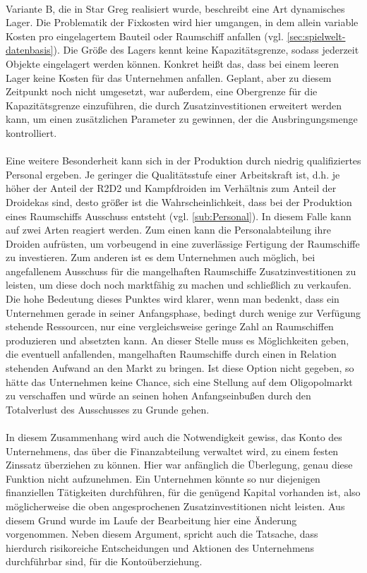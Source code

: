 \\
Variante B, die in Star Greg realisiert wurde, beschreibt eine Art dynamisches Lager. Die Problematik der Fixkosten wird hier umgangen, in dem allein variable Kosten pro eingelagertem Bauteil oder Raumschiff anfallen (vgl. \ref{sec:spielwelt-datenbasis}). Die Größe des Lagers kennt keine Kapazitätsgrenze, sodass jederzeit Objekte eingelagert werden können. Konkret heißt das, dass bei einem leeren Lager keine Kosten für das Unternehmen anfallen. Geplant, aber zu diesem Zeitpunkt noch nicht umgesetzt, war außerdem, eine Obergrenze für die Kapazitätsgrenze einzuführen, die durch Zusatzinvestitionen erweitert werden kann, um einen zusätzlichen Parameter zu gewinnen, der die Ausbringungsmenge kontrolliert. 
\\
\\
Eine weitere Besonderheit kann sich in der Produktion durch niedrig qualifiziertes Personal ergeben. Je geringer die Qualitätsstufe einer Arbeitskraft ist, d.h. je höher der Anteil der R2D2 und Kampfdroiden im Verhältnis zum Anteil der Droidekas sind, desto größer ist die Wahrscheinlichkeit, dass bei der Produktion eines Raumschiffs Ausschuss entsteht (vgl. \ref{sub:Personal}). In diesem Falle kann auf zwei Arten reagiert werden. Zum einen kann die Personalabteilung ihre Droiden aufrüsten, um vorbeugend in eine zuverlässige Fertigung der Raumschiffe zu investieren. Zum anderen ist es dem Unternehmen auch möglich, bei angefallenem Ausschuss für die mangelhaften Raumschiffe Zusatzinvestitionen zu leisten, um diese doch noch marktfähig zu machen und schließlich zu verkaufen. Die hohe Bedeutung dieses Punktes wird klarer, wenn man bedenkt, dass ein Unternehmen gerade in seiner Anfangsphase, bedingt durch wenige zur Verfügung stehende Ressourcen, nur eine vergleichsweise geringe Zahl an Raumschiffen produzieren und absetzten kann. An dieser Stelle muss es Möglichkeiten geben, die eventuell anfallenden, mangelhaften Raumschiffe durch einen in Relation stehenden Aufwand an den Markt zu bringen. Ist diese Option nicht gegeben, so hätte das Unternehmen keine Chance, sich eine Stellung auf dem Oligopolmarkt zu verschaffen und würde an seinen hohen Anfangseinbußen durch den Totalverlust des Ausschusses zu Grunde gehen. 
\\
\\
In diesem Zusammenhang wird auch die Notwendigkeit gewiss, das Konto des Unternehmens, das über die Finanzabteilung verwaltet wird, zu einem festen Zinssatz überziehen zu können. Hier war anfänglich die Überlegung, genau diese Funktion nicht aufzunehmen. Ein Unternehmen könnte so nur diejenigen finanziellen Tätigkeiten durchführen, für die genügend Kapital vorhanden ist, also möglicherweise die oben angesprochenen Zusatzinvestitionen nicht leisten. Aus diesem Grund wurde im Laufe der Bearbeitung hier eine Änderung vorgenommen.  Neben diesem Argument, spricht auch die Tatsache, dass hierdurch risikoreiche Entscheidungen und Aktionen des Unternehmens durchführbar sind, für die Kontoüberziehung.

\autorende{}

